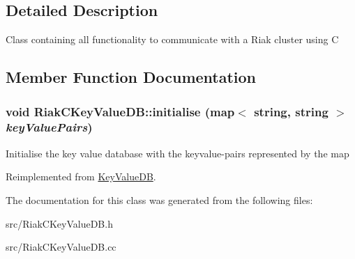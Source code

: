 \subsection{Detailed Description}
Class containing all functionality to communicate with a Riak cluster using C 

\subsection{Member Function Documentation}
\hypertarget{classRiakCKeyValueDB_ac57a6fe1e7b1d5759dcb43915d4f65da}{
\subsubsection[{initialise}]{\setlength{\rightskip}{0pt plus 5cm}void RiakCKeyValueDB::initialise (map$<$ string, string $>$ {\em keyValuePairs})}}
\label{classRiakCKeyValueDB_ac57a6fe1e7b1d5759dcb43915d4f65da}
Initialise the key value database with the keyvalue-\/pairs represented by the map 

Reimplemented from \hyperlink{classKeyValueDB_aebd32f35aa2c11ac0d071bd8307fc521}{KeyValueDB}.

The documentation for this class was generated from the following files:\begin{DoxyCompactItemize}
\item 
src/RiakCKeyValueDB.h\item 
src/RiakCKeyValueDB.cc\end{DoxyCompactItemize}
